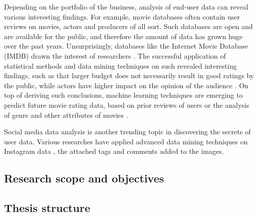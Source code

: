     Depending on the portfolio of the business, analysis of end-user data can reveal various interesting findings. For example, movie databases often contain user reviews on movies, actors and producers of all sort. Such databases are open and are available for the public, and therefore the amount of data has grown huge over the past years. Unsurprisingly, databases like the Internet Movie Database (IMDB) drawn the interest of researchers \cite{saraee2004data, kabinsingha2012movie, sumathi2013performance}. The successful application of statistical methods and data mining techniques on such revealed interesting findings, such as that larger budget does not necessarily result in good ratings by the public, while actors have higher impact on the opinion of the audience \cite{saraee2004data}. On top of deriving such conclusions, machine learning techniques are emerging to predict future movie rating data, based on prior reviews of users \cite{saraee2004data} or the analysis of genre and other attributes of movies \cite{kabinsingha2012movie}.

    Social media data analysis is another trending topic in discovering the secrets of user data. Various researches have applied advanced data mining techniques on Instagram data \cite{jang2015noreciprocity, bakhshi2014faces, hu2014we, jang2016teensengagemorewithfewerphotos, han2016teensarefrommars}, the attached tags and comments added to the images. 





\subsection{Research scope and objectives}


\subsection{Thesis structure}

